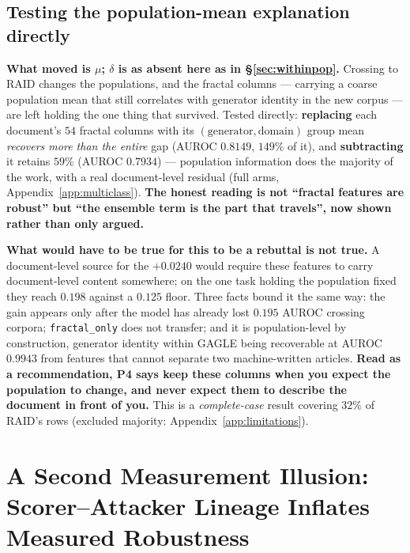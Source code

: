 \documentclass{article}
\newcommand{\arm}[1]{\texttt{#1}}
\begin{document}
\subsection*{Testing the population-mean explanation directly}

\textbf{What moved is $\mu$; $\delta$ is as absent here as in
\S\ref{sec:withinpop}.} Crossing to RAID changes the populations, and the
fractal columns --- carrying a coarse population mean that still correlates
with generator identity in the new corpus --- are left holding the one thing
that survived. Tested directly: \textbf{replacing} each document's $54$
fractal columns with its $(\text{generator},\text{domain})$ group mean
\emph{recovers more than the entire} gap (AUROC $0.8149$, $149\%$ of it), and
\textbf{subtracting} it retains $59\%$ (AUROC $0.7934$) --- population
information does the majority of the work, with a real document-level
residual (full arms, Appendix~\ref{app:multiclass}). \textbf{The honest
reading is not ``fractal features are robust'' but ``the ensemble term is the
part that travels'', now shown rather than only argued.}

\textbf{What would have to be true for this to be a rebuttal is not true.} A
document-level source for the $+0.0240$ would require these features to
carry document-level content somewhere; on the one task holding the
population fixed they reach $0.198$ against a $0.125$ floor. Three facts
bound it the same way: the gain appears only after the model has already
lost $0.195$ AUROC crossing corpora; \arm{fractal\_only} does not transfer;
and it is population-level by construction, generator identity within GAGLE
being recoverable at AUROC $0.9943$ from features that cannot separate two
machine-written articles. \textbf{Read as a recommendation, P4 says keep
these columns when you expect the population to change, and never expect
them to describe the document in front of you.} This is a
\emph{complete-case} result covering $32\%$ of RAID's rows (excluded
majority: Appendix~\ref{app:limitations}).

\section{A Second Measurement Illusion: Scorer--Attacker Lineage Inflates Measured Robustness}
\label{sec:lineage}
\end{document}

